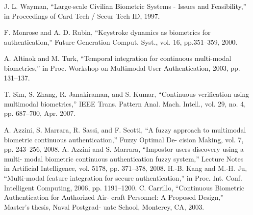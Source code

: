 \begin{thebibliography}{77}
J. L. Wayman,
“Large-scale Civilian Biometric Systems - Issues and Feasibility,” in Proceedings of Card Tech /
Secur Tech ID, 1997.

F. Monrose and A. D. Rubin, 
“Keystroke dynamics as biometrics for authentication,” 
Future Generation Comput. Syst., vol. 16, pp.351–359, 2000.

A. Altinok and M. Turk, 
“Temporal integration for continuous multi-modal biometrics,”
in Proc. Workshop on Multimodal User Authentication, 2003, pp. 131–137.

T. Sim, S. Zhang, R. Janakiraman, and S. Kumar, 
“Continuous verification using multimodal biometrics,” 
IEEE Trans. Pattern Anal. Mach. Intell., vol. 29, no. 4, pp. 687–700, Apr. 2007.

A. Azzini, S. Marrara, R. Sassi, and F. Scotti, “A fuzzy approach to
multimodal biometric continuous authentication,” Fuzzy Optimal De-
cision Making, vol. 7, pp. 243–256, 2008.
A. Azzini and S. Marrara, “Impostor users discovery using a multi-
modal biometric continuous authentication fuzzy system,” Lecture
Notes in Artificial Intelligence, vol. 5178, pp. 371–378, 2008.
H.-B. Kang and M.-H. Ju, “Multi-modal feature integration for secure
authentication,” in Proc. Int. Conf. Intelligent Computing, 2006, pp.
1191–1200.
C. Carrillo, “Continuous Biometric Authentication for Authorized Air-
craft Personnel: A Proposed Design,” Master’s thesis, Naval Postgrad-
uate School, Monterey, CA, 2003.

\end{thebibliography}
